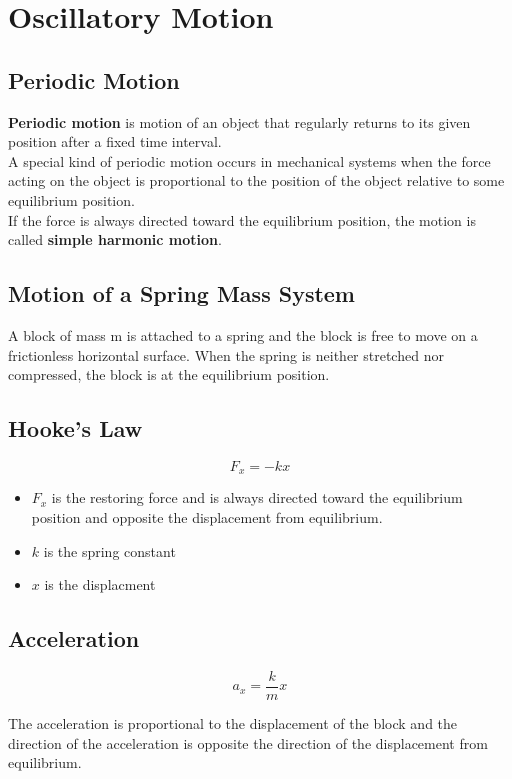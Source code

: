\section{Oscillatory Motion}

\subsection{Periodic Motion}
\textbf{Periodic motion} is motion of an object that regularly returns to its given position after a fixed time interval. \\

A special kind of periodic motion occurs in mechanical systems when the force acting on the object is proportional to the position of the object relative to some equilibrium position. \\

If the force is always directed toward the equilibrium position, the motion is called \textbf{simple harmonic motion}.

\subsection{Motion of a Spring Mass System}
A block of mass m is attached to a spring and the block is free to move on a frictionless horizontal surface. When the spring is neither stretched nor compressed, the block is at the equilibrium position.

\subsection{Hooke's Law}
\[F_x=-kx\]
\begin{itemize}
	\item $F_x$ is the restoring force and is always directed toward the equilibrium position and opposite the displacement from equilibrium.
	\item $k$ is the spring constant
	\item $x$ is the displacment

\end{itemize}

\subsection{Acceleration}
\[a_x=\frac{k}{m}x\]

The acceleration is proportional to the displacement of the block and the direction of the acceleration is opposite the direction of the displacement from equilibrium. 

